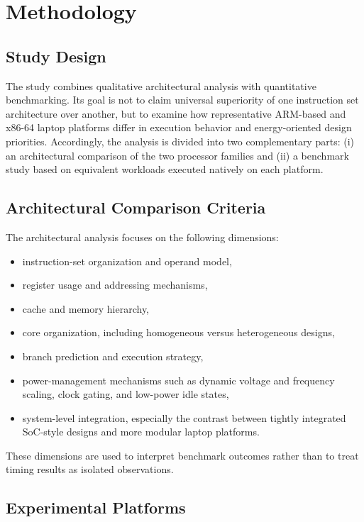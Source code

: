 \documentclass{tcsa}
\begin{document}
\section{Methodology}

\subsection{Study Design}

The study combines qualitative architectural analysis with quantitative benchmarking. 
Its goal is not to claim universal superiority of one instruction set architecture 
over another, but to examine how representative ARM-based and x86-64 laptop 
platforms differ in execution behavior and energy-oriented design priorities. 
Accordingly, the analysis is divided into two complementary parts: (i) an 
architectural comparison of the two processor families and (ii) a benchmark study 
based on equivalent workloads executed natively on each platform.

\subsection{Architectural Comparison Criteria}

The architectural analysis focuses on the following dimensions:

\begin{itemize}
    \item instruction-set organization and operand model,
    \item register usage and addressing mechanisms,
    \item cache and memory hierarchy,
    \item core organization, including homogeneous versus heterogeneous designs,
    \item branch prediction and execution strategy,
    \item power-management mechanisms such as dynamic voltage and frequency scaling, 
    clock gating, and low-power idle states,
    \item system-level integration, especially the contrast between tightly 
    integrated SoC-style designs and more modular laptop platforms.
\end{itemize}

These dimensions are used to interpret benchmark outcomes rather than to treat timing 
results as isolated observations.

\subsection{Experimental Platforms}
\end{document}
